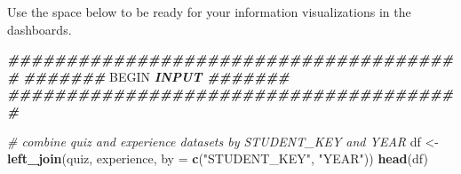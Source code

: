 \documentclass[
]{article}
\newenvironment{Shaded}{\begin{snugshade}}{\end{snugshade}}
\newcommand{\AttributeTok}[1]{\textcolor[rgb]{0.13,0.29,0.53}{#1}}
\newcommand{\CommentTok}[1]{\textcolor[rgb]{0.56,0.35,0.01}{\textit{#1}}}
\newcommand{\DocumentationTok}[1]{\textcolor[rgb]{0.56,0.35,0.01}{\textbf{\textit{#1}}}}
\newcommand{\FunctionTok}[1]{\textcolor[rgb]{0.13,0.29,0.53}{\textbf{#1}}}
\newcommand{\NormalTok}[1]{#1}
\newcommand{\OtherTok}[1]{\textcolor[rgb]{0.56,0.35,0.01}{#1}}
\newcommand{\RegionMarkerTok}[1]{#1}
\newcommand{\StringTok}[1]{\textcolor[rgb]{0.31,0.60,0.02}{#1}}
\begin{document}
Use the space below to be ready for your information visualizations in
the dashboards.

\begin{Shaded}
\begin{Highlighting}[]
\DocumentationTok{\#\#\#\#\#\#\#\#\#\#\#\#\#\#\#\#\#\#\#\#\#\#\#\#\#\#\#\#\#\#\#\#\#\#\#\#\#\#\#}
\DocumentationTok{\#\#\#\#\#\#\# }\RegionMarkerTok{BEGIN}\DocumentationTok{ INPUT             \#\#\#\#\#\#\#}
\DocumentationTok{\#\#\#\#\#\#\#\#\#\#\#\#\#\#\#\#\#\#\#\#\#\#\#\#\#\#\#\#\#\#\#\#\#\#\#\#\#\#\#}

\CommentTok{\# combine quiz and experience datasets by STUDENT\_KEY and YEAR}
\NormalTok{df }\OtherTok{\textless{}{-}} \FunctionTok{left\_join}\NormalTok{(quiz, experience, }\AttributeTok{by =} \FunctionTok{c}\NormalTok{(}\StringTok{"STUDENT\_KEY"}\NormalTok{, }\StringTok{"YEAR"}\NormalTok{))}
\FunctionTok{head}\NormalTok{(df)}
\end{Highlighting}
\end{Shaded}
\end{document}
